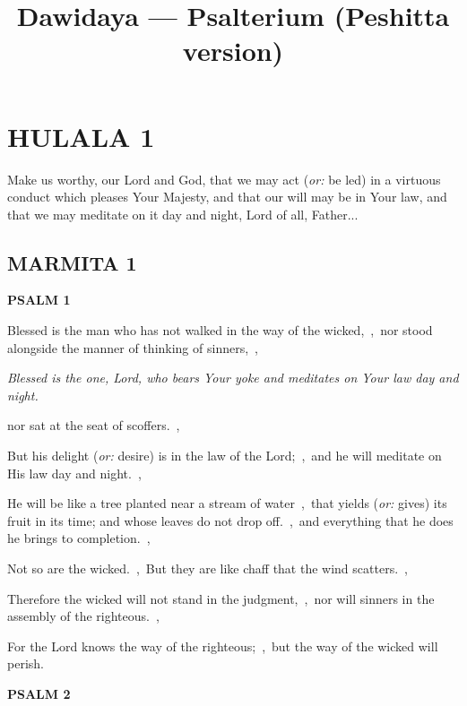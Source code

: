 \documentclass[12pt,twoside,a5paper]{article}
\newcommand{\hulala}[1]{\section*{HULALA {#1}}}
\newcommand{\marmita}[1]{\subsection*{MARMITA {#1}}}
\newcommand{\psalm}[1]{\textbf{PSALM {#1}}\nopagebreak}
\newcommand{\qanona}[1]{{\liturgicalhint{Qanona.} \emph{#1}}}
\newcommand{\slota}[1]{\liturgicalhint{Slota.} #1}
\newcommand{\translationoption}[1]{\emph{or:} #1}
\begin{document}

\title{Dawidaya --- Psalterium (Peshitta version)}
\author{}
\date{}
\maketitle


\hulala{1}

\slota{Make us worthy, our Lord and God, that we may act (\translationoption{be led})  in a virtuous conduct which pleases Your Majesty, and that our will may be in Your law, and that we may meditate on it day and night, Lord of all, Father...}

\marmita{1}

\psalm{1}

\begin{normalparskip}
  Blessed is the man who has not walked in the way of the wicked,~\sep\ nor stood alongside the manner of thinking of sinners,~\sep

  \qanona{Blessed is the one, Lord, who bears Your yoke and meditates on Your law day and night.}

  nor sat at the seat of scoffers.~\sep

  But his delight (\translationoption{desire}) is in the law of the Lord;~\sep\ and he will meditate on His law day and night.~\sep

  He will be like a tree planted near a stream of water~\sep\ that yields (\translationoption{gives}) its fruit in its time; and whose leaves do not drop off.~\sep\ and everything that he does he brings to completion.~\sep

  Not so are the wicked.~\sep\ But they are like chaff that the wind scatters.~\sep

  Therefore the wicked will not stand in the judgment,~\sep\ nor will sinners in the assembly of the righteous.~\sep

  For the Lord knows the way of the righteous;~\sep\ but the way of the wicked will perish.
\end{normalparskip}

\psalm{2}
\end{document}
